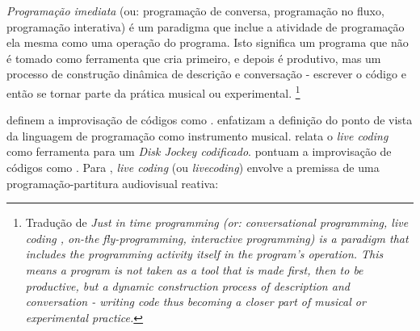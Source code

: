 

\begin{citacao}
\emph{Programação imediata} (ou: programação de conversa, programação no fluxo, programação interativa) é um paradigma que inclue a atividade de programação ela mesma como uma operação do programa. Isto significa um programa que não é tomado como ferramenta que cria primeiro, e depois é produtivo, mas um processo de construção dinâmica de descrição e conversação - escrever o código e então se tornar parte da prática musical ou experimental. \cite[Verbete JITLib]{supercollider.org_supercollider_2014}\footnote{Tradução de \emph{Just in time programming (or: conversational programming, live coding , on-the fly-programming, interactive programming) is a paradigm that includes the programming activity itself in the program's operation. This means a program is not taken as a tool that is made first, then to be productive, but a dynamic construction process of description and conversation - writing code thus becoming a closer part of musical or experimental practice.}}
\end{citacao}

 definem a improvisação de códigos como .  enfatizam a definição do ponto de vista da linguagem de programação como instrumento musical.  relata o \emph{live coding} como ferramenta para um \emph{Disk Jockey codificado}.   pontuam a improvisação de códigos como . Para , \emph{live coding} (ou \emph{livecoding}) envolve a premissa de uma programação-partitura audiovisual reativa: 

